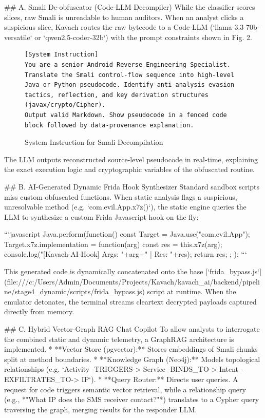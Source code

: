 \documentclass[conference]{IEEEtran}
\begin{document}
## A. Smali De-obfuscator (Code-LLM Decompiler)
While the classifier scores slices, raw Smali is unreadable to human auditors. When an analyst clicks a suspicious slice, Kavach routes the raw bytecode to a Code-LLM (`llama-3.3-70b-versatile` or `qwen2.5-coder-32b`) with the prompt constraints shown in Fig. 2.

\begin{figure}[h]
\centering
\begin{lstlisting}[basicstyle=\ttfamily\scriptsize]
[System Instruction]
You are a senior Android Reverse Engineering Specialist.
Translate the Smali control-flow sequence into high-level Java or Python pseudocode. Identify anti-analysis evasion tactics, reflection, and key derivation structures (javax/crypto/Cipher).
Output valid Markdown. Show pseudocode in a fenced code block followed by data-provenance explanation.
\end{lstlisting}
\caption{System Instruction for Smali Decompilation}
\label{fig:prompt_decompile}
\end{figure}

The LLM outputs reconstructed source-level pseudocode in real-time, explaining the exact execution logic and cryptographic variables of the obfuscated routine.

## B. AI-Generated Dynamic Frida Hook Synthesizer
Standard sandbox scripts miss custom obfuscated functions. When static analysis flags a suspicious, unresolvable method (e.g. `com.evil.App.x7z()`), the static engine queries the LLM to synthesize a custom Frida Javascript hook on the fly:

```javascript
Java.perform(function() {
  const Target = Java.use("com.evil.App");
  Target.x7z.implementation = function(arg) {
    const res = this.x7z(arg);
    console.log("[Kavach-AI-Hook] Args: "+arg+" | Res: "+res);
    return res;
  };
});
```

This generated code is dynamically concatenated onto the base [`frida_bypass.js`](file:///c:/Users/Admin/Documents/Projects/Kavach/kavach_ai/backend/pipeline/stage4_dynamic/scripts/frida_bypass.js) script at runtime. When the emulator detonates, the terminal streams cleartext decrypted payloads captured directly from memory.

## C. Hybrid Vector-Graph RAG Chat Copilot
To allow analysts to interrogate the combined static and dynamic telemetry, a GraphRAG architecture is implemented. 
* **Vector Store (pgvector):** Stores embeddings of Smali chunks split at method boundaries.
* **Knowledge Graph (Neo4j):** Models topological relationships (e.g. `Activity -TRIGGERS-> Service -BINDS_TO-> Intent -EXFILTRATES_TO-> IP`).
* **Query Router:** Directs user queries. A request for code triggers semantic vector retrieval, while a relationship query (e.g., *"What IP does the SMS receiver contact?"*) translates to a Cypher query traversing the graph, merging results for the responder LLM.
\end{document}
